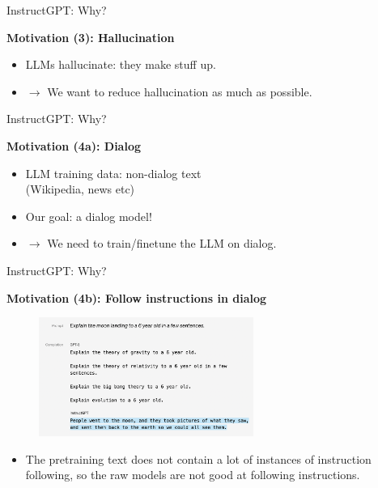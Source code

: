 \begin{vbframe}{InstructGPT: Why?}

\vfill

\textbf{Motivation (3): Hallucination}

	\begin{itemize}
		\item LLMs hallucinate: they make stuff up.
		\item $\rightarrow$ We want to reduce
                hallucination as much as possible.
	\end{itemize}

\vfill

\end{vbframe}

\begin{vbframe}{InstructGPT: Why?}

\vfill

\textbf{Motivation (4a): Dialog}

	\begin{itemize}
		\item LLM training data: non-dialog text\\
                (Wikipedia, news etc)
		\item Our goal: a dialog model!
		\item $\rightarrow$ We need to train/finetune the LLM on dialog.
	\end{itemize}

\vfill

\end{vbframe}




\begin{vbframe}{InstructGPT: Why?}

\vfill

\textbf{Motivation (4b): Follow instructions in dialog}


\vfill

\begin{figure}
\centering
\includegraphics[width = 7cm]{figure/moon6yearold.png}
\end{figure}

\begin{itemize}
	\item The pretraining text does not contain a lot of
	instances of instruction following, so the raw
	models are not good at following instructions.
\end{itemize}



\vfill

\end{vbframe}






